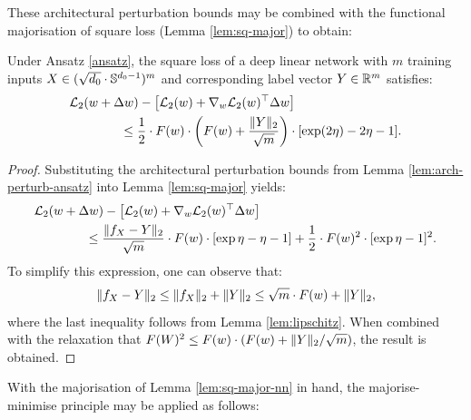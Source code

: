 \begin{refsection}
These architectural perturbation bounds may be combined with the functional majorisation of square loss (Lemma \ref{lem:sq-major}) to obtain:

\begin{lemma}\label{lem:sq-major-nn} Under Ansatz \ref{ansatz}, the square loss of a deep linear network with $m$ training inputs $X\in (\sqrt{d_0}\cdot\mathbb{S}^{d_0-1})^m$ and corresponding label vector $Y\in \mathbb{R}^m$ satisfies:
    \begin{align}
        &\mathcal{L}_2(w+\Delta w) -\left[ \mathcal{L}_2(w) + \nabla_w\mathcal{L}_2(w)^\top \Delta w\right]\nonumber \\
        &\qquad\qquad\leq \frac{1}{2} \cdot F(w)\cdot\left(F(w) + \frac{\Vert {Y} \Vert_2}{\sqrt{m}}\right)\cdot[ \exp(2\eta) -2 \eta - 1 ].
    \end{align}
\end{lemma}
\begin{proof} Substituting the architectural perturbation bounds from Lemma \ref{lem:arch-perturb-ansatz} into Lemma \ref{lem:sq-major} yields:
\begin{align*}
    &\mathcal{L}_2(w+\Delta w) -\left[ \mathcal{L}_2(w) + \nabla_w\mathcal{L}_2(w)^\top \Delta w\right]\nonumber \\
        &\qquad\qquad\leq \frac{\Vert {f_X-Y} \Vert_2}{\sqrt{m}}\cdot F(w)\cdot [\exp \eta - \eta - 1] + \frac{1}{2}\cdot F(w)^2 \cdot [\exp \eta - 1]^2.
\end{align*}
To simplify this expression, one can observe that:
\begin{align*}
    \Vert {f_X-Y} \Vert_2 \leq \Vert {f_X} \Vert_2 + \Vert {Y} \Vert_2 \leq  \sqrt{m}\cdot F(w) + \Vert {Y} \Vert_2,
\end{align*}
where the last inequality follows from Lemma \ref{lem:lipschitz}. When combined with the relaxation that $F(W)^2 \leq F(w) \cdot (F(w) + \Vert {Y} \Vert_2/\sqrt{m})$, the result is obtained.
\end{proof}

With the majorisation of Lemma \ref{lem:sq-major-nn} in hand, the majorise-minimise principle may be applied as follows:


\end{refsection}
